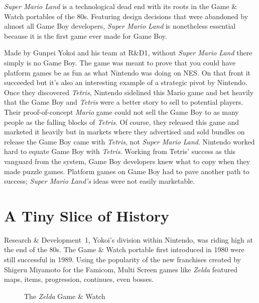 \documentclass{book}
\begin{document}
\emph{Super Mario Land} is a technological dead end with its roots in the Game \& Watch portables of the 80s. Featuring design decisions that were abandoned by almost all Game Boy developers, \emph{Super Mario Land} is nonetheless essential because it is the first game ever made for Game Boy.\par
Made by Gunpei Yokoi and his team at R\&D1, without \emph{Super Mario Land} there simply is no Game Boy. The game was meant to prove that you could have platform games be as fun as what Nintendo was doing on NES. On that front it succeeded but it’s also an interesting example of a strategic pivot by Nintendo. Once they discovered \emph{Tetris}, Nintendo sidelined this Mario game and bet heavily that the Game Boy and \emph{Tetris} were a better story to sell to potential players. Their proof-of-concept \emph{Mario} game could not sell the Game Boy to as many people as the falling blocks of \emph{Tetris}. Of course, they released this game and marketed it heavily but in markets where they advertised and sold bundles on release the Game Boy came with \emph{Tetris}, not \emph{Super Mario Land}. Nintendo worked hard to equate Game Boy with \emph{Tetris}. Working from Tetris’ success as this vanguard from the system, Game Boy developers knew what to copy when they made puzzle games. Platform games on Game Boy had to pave another path to success; \emph{Super Mario Land’s} ideas were not easily marketable.\par
\FloatBarrier\section*{A Tiny Slice of History}
Research \& Development~1, Yokoi’s division within Nintendo, was riding high at the end of the 80s. The Game \& Watch portable first introduced in 1980 were still successful in 1989. Using the popularity of the new franchises created by Shigeru Miyamoto for the Famicom, Multi Screen games like \emph{Zelda} featured maps, items, progression, continues, even bosses.\par
\FloatBarrier\vspace{\baselineskip}\begin{figure}[H]\caption*{The \emph{Zelda} Game \& Watch}\end{figure}
\end{document}
